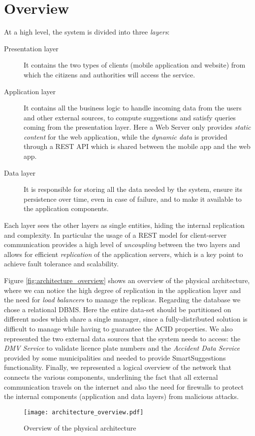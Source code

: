 \section{Overview} \label{sec:overview}
At a high level, the system is divided into three \emph{layers}:
\begin{description}
    \item[Presentation layer] It contains the two types of clients (mobile
    application and website) from which the citizens and authorities will access
    the service.
    \item[Application layer] It contains all the business logic to handle
    incoming data from the users and other external sources, to compute
    suggestions and satisfy queries coming from the presentation layer.
    Here a Web Server only provides \emph{static content} for the web
    application, while the \emph{dynamic data} is provided through a REST API
    which is shared between the mobile app and the web app.
    \item[Data layer] It is responsible for storing all the data needed by the
    system, ensure its persistence over time, even in case of failure, and to
    make it available to the application components.
\end{description}
Each layer sees the other layers as single entities, hiding the internal
replication and complexity. In particular the usage of a REST model for
client-server communication provides a high level of \emph{uncoupling} between
the two layers and allows for efficient \emph{replication} of the application
servers, which is a key point to achieve fault tolerance and scalability.

Figure \vref{fig:architecture_overview} shows an overview of the physical
architecture, where we can notice the high degree of replication in the
application layer and the need for \emph{load balancers} to manage the
replicas.
Regarding the database we chose a relational DBMS. Here the entire data-set
should be partitioned on different nodes which share a single manager, since a
fully-distributed solution is difficult to manage while having to guarantee the
ACID properties.
We also represented the two external data sources that the system needs to
access: the \emph{DMV Service} to validate licence plate numbers and the
\emph{Accident Data Service} provided by some municipalities and needed to
provide SmartSuggestions functionality.
Finally, we represented a logical overview of the network that connects the
various components, underlining the fact that all external communication
travels on the internet and also the need for firewalls to protect the internal
components (application and data layers) from malicious attacks.

\begin{figure}[ht]
    \centering
    \texttt{[image: architecture\_overview.pdf]}
    \caption{Overview of the physical architecture}
    \label{fig:architecture_overview}
\end{figure}